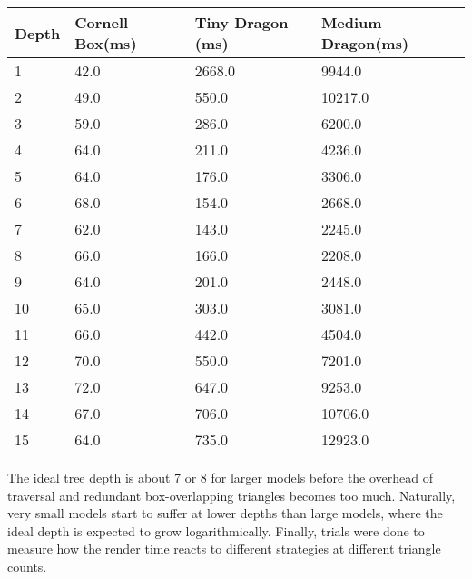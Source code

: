 \documentclass[letterpaper, 10 pt, conference]{ieeeconf}  %
\begin{document}
\begin{table}[H]

\begin{tabular}{@{}llll@{}}
\toprule
Depth & Cornell Box(ms) & Tiny Dragon (ms) & Medium Dragon(ms) \\ \midrule
1     & 42.0            & 2668.0           & 9944.0            \\
2     & 49.0            & 550.0            & 10217.0           \\
3     & 59.0            & 286.0            & 6200.0            \\
4     & 64.0            & 211.0            & 4236.0            \\
5     & 64.0            & 176.0            & 3306.0            \\
6     & 68.0            & 154.0            & 2668.0            \\
7     & 62.0            & 143.0            & 2245.0            \\
8     & 66.0            & 166.0            & 2208.0            \\
9     & 64.0            & 201.0            & 2448.0            \\
10    & 65.0            & 303.0            & 3081.0            \\
11    & 66.0            & 442.0            & 4504.0            \\
12    & 70.0            & 550.0            & 7201.0            \\
13    & 72.0            & 647.0            & 9253.0            \\
14    & 67.0            & 706.0            & 10706.0           \\
15    & 64.0            & 735.0            & 12923.0           \\ \bottomrule
\end{tabular}
\end{table}

The ideal tree depth is about 7 or 8 for larger models before the overhead of traversal and redundant box-overlapping triangles becomes too much. Naturally, very small models start to suffer at lower depths than large models, where the ideal depth is expected to grow logarithmically. Finally, trials were done to measure how the render time reacts to different strategies at different triangle counts.
\end{document}

